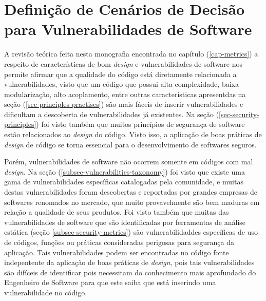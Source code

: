 %



\section{Definição de Cenários de Decisão para Vulnerabilidades de Software}

A revisão teórica feita nesta monografia encontrada no capítulo (\ref{cap-metrics}) a respeito de características de bom \emph{design} e vulnerabilidades de software nos permite afirmar que a qualidade do código está diretamente relacionada a vulnerabilidades, visto que um código que possui alta complexidade, baixa modularização, alto acoplamento, entre outras caracteristicas apresentdas na seção (\ref{sec-principles-practises}) são mais fáceis de inserir vulnerabilidades e dificultam a descoberta de vulnerabilidades já existentes. Na seção (\ref{sec-security-principles}) foi visto também que muitos princípios de segurança de software estão relacionados ao \emph{design} do código. Visto isso, a aplicação de boas práticas de \emph{design} de código se torna essencial para o desenvolvimento de softwares seguros.

%

Porém, vulnerabilidades de software não ocorrem somente em códigos com mal \emph{design}. Na seção (\ref{subsec-vulnerabilities-taxonomy}) foi visto que existe uma gama de vulnerabilidades específicas catalogadas pela comunidade, e muitas destas vulnerabilidades foram descobertas e reportadas por grandes empresas de softwares renomados no mercado, que muito provavelmente são bem maduras em relação a qualidade de seus produtos. Foi visto também que muitas das vulnerabilidades de software que são identificadas por ferramentas de análise estática (seção \ref{subsec-security-metrics}) são vulnerabilidaddes específicas de uso de códigos, funções ou práticas consideradas perigosas para segurança da aplicação. Tais vulnerabilidades podem ser encontradas no código fonte indepentente da aplicação de boas práticas de \emph{design}, pois tais vulnerabilidades são difíceis de identificar pois necessitam do conhecimento mais aprofundado do Engenheiro de Software para que este saiba que está inserindo uma vulnerabilidade no código.

